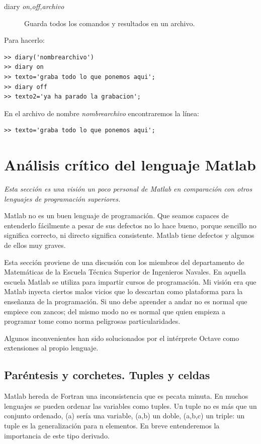 \begin{description}
\item [{diary \textsl{on,off,archivo}}]Guarda todos los
  comandos y resultados en un archivo.
\end{description}
Para hacerlo:

\begin{lstlisting}
>> diary('nombrearchivo')
>> diary on
>> texto='graba todo lo que ponemos aqui';
>> diary off
>> texto2='ya ha parado la grabacion';
\end{lstlisting}

En el archivo de nombre \emph{nombrearchivo} encontraremos la línea:

\begin{lstlisting}
>> texto='graba todo lo que ponemos aqui';
\end{lstlisting}


\section{Análisis crítico del lenguaje Matlab}

\emph{Esta sección es una visión un poco personal de Matlab en
  comparación con otros lenguajes de programación superiores.}

Matlab no es un buen lenguaje de programación.  Que seamos capaces de
entenderlo fácilmente a pesar de sus defectos no lo hace bueno, porque
sencillo no significa correcto, ni directo significa consistente.
Matlab tiene defectos y algunos de ellos muy graves.

Esta sección proviene de una discusión con los miembros del
departamento de Matemáticas de la Escuela Técnica Superior de Ingenieros
Navales. En aquella escuela Matlab se utiliza para impartir cursos de
programación.  Mi visión era que Matlab inyecta ciertos malos vicios
que lo descartan como plataforma para la enseñanza de la
programación.  Si uno debe aprender a andar no es normal que empiece
con zancos; del mismo modo no es normal que quien empieza a
programar tome como norma peligrosas particularidades.

Algunos inconvenientes han sido solucionados por el intérprete Octave
como extensiones al propio lenguaje.

\subsection{Paréntesis y corchetes. Tuples y celdas}

Matlab hereda de Fortran una inconsistencia que es pecata minuta. En
muchos lenguajes se pueden ordenar las variables como tuples. Un tuple
no es más que un conjunto ordenado, (a) sería una variable, (a,b) un
doble, (a,b,c) un triple: un tuple es la generalización para n
elementos. En breve entenderemos la importancia de este tipo derivado.

